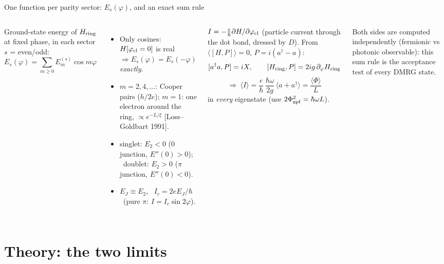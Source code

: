 \documentclass[aspectratio=169,9pt]{beamer}
\newcommand{\hw}{\hbar\omega}
\newcommand{\Hring}{H_{\rm ring}}
\newcommand{\pcl}{\varphi_{\rm cl}}
\renewcommand{\cite}[1]{{\scriptsize\textcolor{ink!60}{[#1]}}}
\begin{document}
\begin{frame}{One function per parity sector: $E_s(\varphi)$, and an exact sum rule}
  \begin{columns}[T]
    Ground-state energy of $\Hring$ at fixed phase, in each sector $s$ = even/odd:
    \[
      E_s(\varphi)=\sum_{m\ge0}E^{(s)}_m\cos m\varphi
    \]
    \begin{itemize}\small
      \item Only cosines: $H[\pcl=0]$ is real $\Rightarrow E_s(\varphi)=E_s(-\varphi)$ \emph{exactly}.
      \item $m=2,4,\dots$: Cooper pairs ($h/2e$); $m=1$: one electron around the ring, $\propto e^{-L/\xi}$
            \cite{Loss--Goldbart 1991}.
      \item singlet: $E_2<0$ (0 junction, $E''(0)>0$); \ doublet: $E_2>0$ ($\pi$ junction, $E''(0)<0$).
      \item $E_J\equiv E_2$, \ $I_c=2eE_J/\hbar$ \ (pure $\pi$: $I=I_c\sin2\varphi$).
    \end{itemize}
    \begin{keybox}[title={Current = displacement of the mode}]
      \small $I=-\frac{e}{\hbar}\partial H/\partial\pcl$ (particle current through the dot bond, dressed by $D$).
      From $\langle[H,P]\rangle=0$, $P=i(a^\dagger-a)$:
      \[
        [a^\dagger a,P]=iX,\qquad [\Hring,P]=2ig\,\partial_\varphi\Hring
      \]
      \[
        \Rightarrow\ \langle I\rangle=\frac{e}{\hbar}\,\frac{\hw}{2g}\,\langle a+a^\dagger\rangle=\frac{\langle\Phi\rangle}{L}
      \]
      in \emph{every} eigenstate (use $2\Phi_{\rm zpf}^2=\hw L$).
    \end{keybox}
    \small Both sides are computed independently (fermionic vs photonic observable):
    this sum rule is the \alert{acceptance test} of every DMRG state.
  \end{columns}
\end{frame}

\section{Theory: the two limits}
\end{document}

